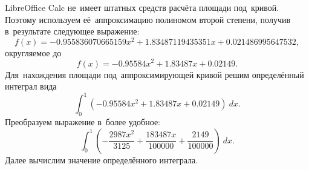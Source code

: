 \documentclass[]{scrreprt}
\begin{document}
LibreOffice Calc не~имеет штатных средств расчёта площади под~кривой. Поэтому используем её~аппроксимацию полиномом второй степени, получив в~результате следующее выражение:
\begin{equation*}\label{eq:ROC-curve-spreadsheet-polynom-approx-1}
f(x)=-0.955836070665159x^2 + 1.83487119435351x+0.021486995647532,
\end{equation*}
округляемое до
\begin{equation*}\label{eq:ROC-curve-spreadsheet-polynom-approx-2}
f(x)=-0.95584x^2 + 1.83487x+0.02149.
\end{equation*}
Для~нахождения площади под~аппроксимирующей кривой решим определённый интеграл вида
\begin{equation*}\label{eq:AUC-integral-0}
\int_{0}^{1}(-0.95584x^2 + 1.83487x+0.02149)~dx.
\end{equation*}
Преобразуем выражение в~более удобное:
\begin{equation*}\label{eq:AUC-integral-1}
\int_{0}^{1}(-\frac{2987x^2}{3125} + \frac{183487x}{100000}+ \frac{2149}{100000})~dx.
\end{equation*}
Далее вычислим значение определённого интеграла.
\end{document}
